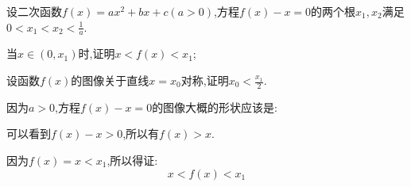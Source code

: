 \documentclass[answers]{exam}
\begin{document}
\begin{questions}
	\question 设二次函数$f(x)=ax^2+bx+c(a>0)$,方程$f(x) - x = 0$的两个根$x_1,x_2$满足$0<x_1<x_2<\frac1a$.
	\begin{penum}
		\item 当$x\in(0,x_1)$时,证明$x<f(x)<x_1$;
		\item 设函数$f(x)$的图像关于直线$x=x_0$对称,证明$x_0<\frac{x_1}{2}$.
	\end{penum}

	\begin{solution}
		\begin{penum}
			\item 因为$a>0$,方程$f(x)-x=0$的图像大概的形状应该是:
			\begin{center}
			\end{center}
			可以看到$f(x) -x > 0$,所以有$f(x) > x$.

			因为$f(x) = x < x_1$,所以得证:
			\begin{equation*}
				x  < f(x) < x_1
			\end{equation*}


\end{penum}
\end{solution}
\end{questions}
\end{document}
